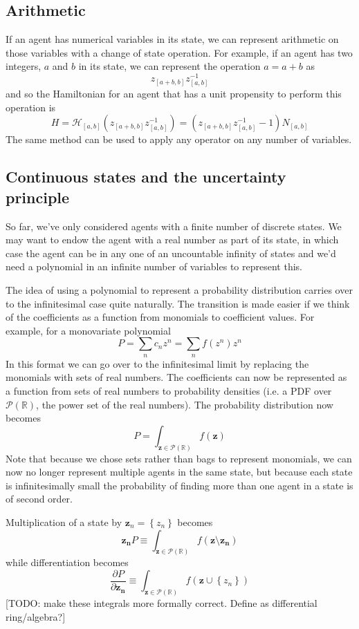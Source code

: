 \documentclass[letterpaper,twocolumn,10pt]{article}
\begin{document}
\subsection{Arithmetic}

If an agent has numerical variables in its state, we can represent arithmetic on those variables with a change of state operation. For example, if an agent has two integers, $a$ and $b$ in its state, we can represent the operation $a = a + b$ as
\[
z_{[a+b,b]}z_{[a,b]}^{-1}
\]
and so the Hamiltonian for an agent that has a unit propensity to perform this operation is
\[
H = \mathcal{H}_{[a,b]}(z_{[a+b,b]}z_{[a,b]}^{-1}) = (z_{[a+b,b]}z_{[a,b]}^{-1}-1)N_{[a,b]}
\]
The same method can be used to apply any operator on any number of variables.

\subsection{Continuous states and the uncertainty principle}

So far, we've only considered agents with a finite number of discrete states. We may want to endow the agent with a real number as part of its state, in which case the agent can be in any one of an uncountable infinity of states and we'd need a polynomial in an infinite number of variables to represent this.

The idea of using a polynomial to represent a probability distribution carries over to the infinitesimal case quite naturally. The transition is made easier if we think of the coefficients as a function from monomials to coefficient values. For example, for a monovariate polynomial
\[
P = \sum_n c_n z^n = \sum_n f(z^n)z^n 
\]
In this format we can go over to the infinitesimal limit by replacing the monomials with sets of real numbers. The coefficients can now be represented as a function from sets of real numbers to probability densities (i.e. a PDF over $\mathcal{P}(\mathbb{R})$, the power set of the real numbers). The probability distribution now becomes
\[
P = \int_{\mathbf{z} \in \mathcal{P}(\mathbb{R})} f(\mathbf{z})
\]
Note that because we chose sets rather than bags to represent monomials, we can now no longer represent multiple agents in the same state, but because each state is infinitesimally small the probability of finding more than one agent in a state is of second order.

Multiplication of a state by $\mathbf{z}_n = \left\{z_n\right\}$ becomes
\[
\mathbf{z_n}P \equiv \int_{\mathbf{z} \in \mathcal{P}(\mathbb{R})} f(\mathbf{z} \setminus\mathbf{z_n})
\]
while differentiation becomes
\[
\frac{\partial P}{\partial \mathbf{z_n}}  \equiv \int_{\mathbf{z} \in \mathcal{P}(\mathbb{R})} f(\mathbf{z} \cup \left\{z_n\right\})
\]
[TODO: make these integrals more formally correct. Define as differential ring/algebra?]
\end{document}

